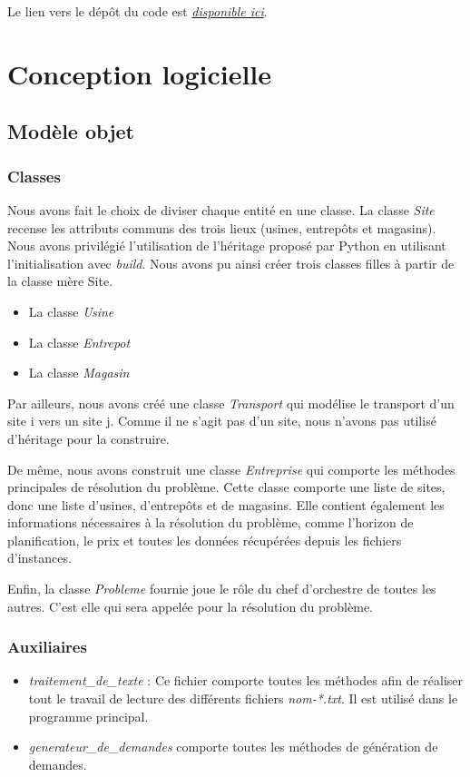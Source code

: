 \documentclass[12pt, a4paper]{article}
\begin{document}
\noindent Le lien vers le dépôt du code est \emph{\href{https://github.com/mistertot/SupplyChainProject}{disponible ici}}.

\newpage


\section{Conception logicielle}
\subsection{Modèle objet}

\subsubsection{Classes}
Nous avons fait le choix de diviser chaque entité en une classe. La classe \emph{Site} recense les attributs communs des trois lieux (usines, entrepôts et magasins). Nous avons privilégié l'utilisation de l'héritage proposé par Python en utilisant l'initialisation avec \emph{build}. Nous avons pu ainsi créer trois classes filles à partir de la classe mère Site.
\begin{itemize}
\item La classe \emph{Usine}
\item La classe \emph{Entrepot}
\item La classe \emph{Magasin}
\end{itemize}

Par ailleurs, nous avons créé une classe \emph{Transport} qui modélise le transport d'un site i vers un site j. Comme il ne s'agit pas d'un site, nous n'avons pas utilisé d'héritage pour la construire.

De même, nous avons construit une classe \emph{Entreprise} qui comporte les méthodes principales de résolution du problème. Cette classe comporte une liste de sites, donc une liste d'usines, d'entrepôts et de magasins. Elle contient également les informations nécessaires à la résolution du problème, comme l'horizon de planification, le prix et toutes les données récupérées depuis les fichiers d'instances.

Enfin, la classe \emph{Probleme} fournie joue le rôle du chef d'orchestre de toutes les autres. C'est elle qui sera appelée pour la résolution du problème.

\subsubsection{Auxiliaires}
\begin{itemize}
\item \emph{traitement\_de\_texte} : Ce fichier comporte toutes les méthodes afin de réaliser tout le travail de lecture des différents fichiers \emph{nom-*.txt}. Il est utilisé dans le programme principal.
\item \emph{generateur\_de\_demandes} comporte toutes les méthodes de génération de demandes.
\end{itemize}
\end{document}
